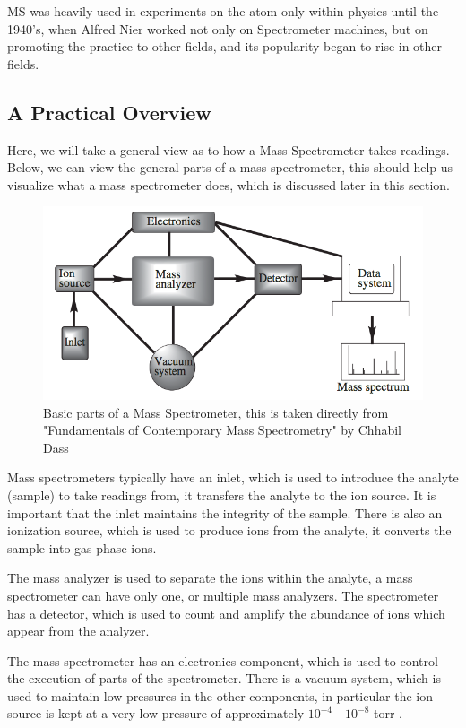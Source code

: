 \documentclass[11pt,openany]{book}
\begin{document}
MS was heavily used in experiments on the atom only within physics until the 1940's, when Alfred Nier worked not only on Spectrometer machines, but on promoting the practice to other fields, and its popularity began to rise in other fields.

\subsection{A Practical Overview}
Here, we will take a general view as to how a Mass Spectrometer takes readings. Below, we can view the general parts of a mass spectrometer, this should help us visualize what a mass spectrometer does, which is discussed later in this section.

\begin{figure}
    \centering
    \includegraphics[scale=0.6]{./images/mass_spectrometry_process_diagram.png}
    \caption{Basic parts of a Mass Spectrometer, this is taken directly from "Fundamentals of Contemporary Mass Spectrometry" by Chhabil Dass \cite{fund_contemp_MS_book}}
    \label{fig:Parts_of_a_mass_spectrometer}
\end{figure}

Mass spectrometers typically have an inlet, which is used to introduce the analyte (sample) to take readings from, it transfers the analyte to the ion source. It is important that the inlet maintains the integrity of the sample. There is also an ionization source, which is used to produce ions from the analyte, it converts the sample into gas phase ions. 

The mass analyzer is used to separate the ions within the analyte, a mass spectrometer can have only one, or multiple mass analyzers. The spectrometer has a detector, which is used to count and amplify the abundance of ions which appear from the analyzer.

The mass spectrometer has an electronics component, which is used to control the execution of parts of the spectrometer. There is a vacuum system, which is used to maintain low pressures in the other components, in particular the ion source is kept at a very low pressure of approximately $10^{-4}$ - $10^{-8}$ torr \cite{fund_contemp_MS_book}. 
\end{document}
